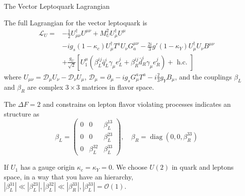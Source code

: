 \documentclass{../bredelebeamer}
\begin{document}
\begin{frame}{The Vector Leptoquark Lagrangian}
	
	The full Lagrangian for the vector leptoquark is
	\begin{align*}
		\mathcal{L}_{U}=&-\frac{1}{2} U_{\mu \nu}^{\dagger} U^{\mu \nu}+M_{U}^{2} U_{\mu}^{\dagger} U^{\mu}\\&-i g_{s}\left(1-\kappa_{c}\right) U_{\mu}^{\dagger} T^{a} U_{\nu} G^{\mu \nu}_a -\frac{2 i}{3} g'\left(1-\kappa_{Y}\right) U_{\mu}^{\dagger} U_{\nu} B^{\mu \nu}\\
		&+\frac{g_{U}}{\sqrt{2}}\left[U_{1}^{\mu}\left(\beta_{L}^{i j} \bar{q}_{L}^{i} \gamma_{\mu} e_{L}^{j}+\beta_{R}^{i j} \bar{d}_{R}^{i} \gamma_{\mu} e_{R}^{j}
		\right)+\text { h.c. }\right]
	\end{align*}
	where $U_{\mu \nu}=\mathcal D_{\mu} U_{\nu}-\mathcal D_{\nu} U_{\mu}$, $\mathcal D_{\mu}=\partial_{\mu}-i g_{s} G_{\mu}^{a} T^{a}-i \frac{2}{3} g_{Y} B_{\mu}$, and the couplings $\beta_{L}$ and $\beta_{R}$ are complex $3 \times 3$ matrices in flavor space. 
	
	\pause \vfill
	
	The $\Delta F=2$ and constrains on lepton flavor violating processes indicates an structure as 
	\begin{equation*}
		\beta_L=\left(\begin{array}{ccc}
			0 & 0 & \beta_L^{13} \\
			0 & 0 & \beta_L^{23} \\
			0 & \beta_L^{32} & \beta_L^{33}
			\end{array}\right), \quad \beta_R=\operatorname{diag}\left(0,0, \beta_R^{33}\right)
	\end{equation*}
	
	If $U_1$ has a gauge origin $\kappa_{c}=\kappa_{Y}=0$. We choose $U(2)$ in quark and leptons space, in a way that you have an hierarchy, $\left|\beta_L^{31}\right| \ll\left|\beta_L^{23}\right|,\left|\beta_L^{32}\right| \ll\left|\beta_R^{33}\right|,\left|\beta_L^{33}\right|=\mathcal{O}(1)$.
	
\end{frame}


	

\end{document}

